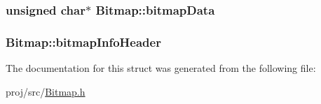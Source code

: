 \subsubsection[{\texorpdfstring{bitmap\+Data}{bitmapData}}]{\setlength{\rightskip}{0pt plus 5cm}unsigned char$\ast$ Bitmap\+::bitmap\+Data}\hypertarget{structBitmap_a581eac36ec50d730299b6df60e644750}{}\label{structBitmap_a581eac36ec50d730299b6df60e644750}
\subsubsection[{\texorpdfstring{bitmap\+Info\+Header}{bitmapInfoHeader}}]{ Bitmap\+::bitmap\+Info\+Header}\hypertarget{structBitmap_a95c481a5ce1ff4af08cd135ca4af120b}{}\label{structBitmap_a95c481a5ce1ff4af08cd135ca4af120b}


The documentation for this struct was generated from the following file\+:\begin{DoxyCompactItemize}
\item 
proj/src/\hyperlink{Bitmap_8h}{Bitmap.\+h}\end{DoxyCompactItemize}
